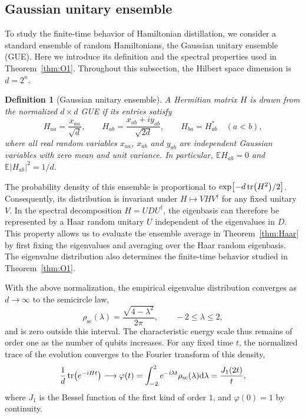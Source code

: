 \documentclass[onecolumn,prx,longbibliography,nofootinbib, superscriptaddress]{revtex4-2}
\newtheorem{definition}{Definition}
\theoremstyle{recap}
\begin{document}
\subsection{Gaussian unitary ensemble}\label{appendix:GUE}
To study the finite-time behavior of Hamiltonian distillation, we consider a standard ensemble of random Hamiltonians, the Gaussian unitary ensemble (GUE). Here we introduce its definition and the spectral properties used in Theorem~\ref{thm:O1}. Throughout this subsection, the Hilbert space dimension is $d=2^n$.

\begin{definition}[Gaussian unitary ensemble]
    A Hermitian matrix $H$ is drawn from the normalized $d\times d$ GUE if its entries satisfy
    \begin{equation}
        H_{aa}=\frac{x_{aa}}{\sqrt{d}},\qquad
        H_{ab}=\frac{x_{ab}+iy_{ab}}{\sqrt{2d}},\qquad
        H_{ba}=H_{ab}^{*}\quad (a<b),
    \end{equation}
    where all real random variables $x_{aa}$, $x_{ab}$ and $y_{ab}$ are independent Gaussian variables with zero mean and unit variance. In particular, $\mathbb{E}H_{ab}=0$ and $\mathbb{E}|H_{ab}|^2=1/d$.
\end{definition}

The probability density of this ensemble is proportional to $\exp[-d\tr(H^2)/2]$. Consequently, its distribution is invariant under $H\mapsto VHV^{\dagger}$ for any fixed unitary $V$. In the spectral decomposition $H=UDU^{\dagger}$, the eigenbasis can therefore be represented by a Haar random unitary $U$ independent of the eigenvalues in $D$. This property allows us to evaluate the ensemble average in Theorem~\ref{thm:Haar} by first fixing the eigenvalues and averaging over the Haar random eigenbasis. The eigenvalue distribution also determines the finite-time behavior studied in Theorem~\ref{thm:O1}.

With the above normalization, the empirical eigenvalue distribution converges as $d\to\infty$ to the semicircle law,
\begin{equation}
    \rho_{\mathrm{sc}}(\lambda)=\frac{\sqrt{4-\lambda^2}}{2\pi},\qquad -2\leq\lambda\leq 2,
\end{equation}
and is zero outside this interval. The characteristic energy scale thus remains of order one as the number of qubits increases. For any fixed time $t$, the normalized trace of the evolution converges to the Fourier transform of this density,
\begin{equation}
    \frac{1}{d}\tr(e^{-iHt})\longrightarrow
    \varphi(t)=\int_{-2}^{2}e^{-i\lambda t}\rho_{\mathrm{sc}}(\lambda)\mathrm{d}\lambda
    =\frac{J_1(2t)}{t},
\end{equation}
where $J_1$ is the Bessel function of the first kind of order $1$, and $\varphi(0)=1$ by continuity.
\end{document}
